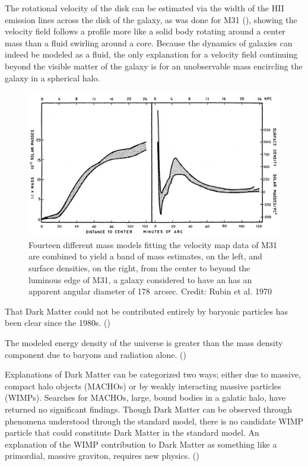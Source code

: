 \documentclass{paper}
\begin{document}
  The rotational velocity of the disk can be estimated via the 
  width of the HII emission lines across the disk of the galaxy, as was done
  for M31 (\cite{1970ApJ...159..379R}), showing the velocity field follows a 
  profile more like a solid body rotating around a center mass than a fluid 
  swirling around a core. Because the dynamics of galaxies can indeed be 
  modeled as a fluid, the only explanation for a velocity field continuing 
  beyond the visible matter of the galaxy is for an unobservable mass 
  encircling the galaxy in a spherical halo.

  \begin{figure}[!htb]
    \begin{centering}
    \includegraphics[scale=0.4]{DM-masscurve.pdf}
    \caption{Fourteen different mass models fitting the velocity map data of
      M31 are combined to yield a band of mass estimates, on the left, and 
      surface densities, on the right, from the center to beyond the luminous 
      edge of M31, a galaxy considered to have an has an apparent angular 
      diameter of \SI{178}{arcsec}.
    Credit: Rubin et al. 1970}
    \label{fig:DM-masscurve}
    \end{centering}
  \end{figure}

  That Dark Matter could not be contributed entirely by baryonic particles
  has been clear since the 1980s. (\cite{liddle2015introduction})

  The modeled energy density of the universe is greater than the mass density
  component due to baryons and radiation alone. 
  (\cite{Clowe_2006})

  Explanations of Dark Matter can be categorized two ways; either due to 
  massive, compact halo objects (MACHOs) or by weakly interacting massive 
  particles (WIMPs). Searches for MACHOs, large, bound bodies in a galatic 
  halo, have returned no significant findings. Though Dark Matter can be 
  observed through phenomena understood through the standard model, there is 
  no candidate WIMP particle that could constitute Dark Matter in the standard 
  model. An explanation of the WIMP contribution to Dark Matter as something 
  like a primordial, massive graviton, requires new physics.
  (\cite{PhysRevLett.128.081806})
\end{document}
